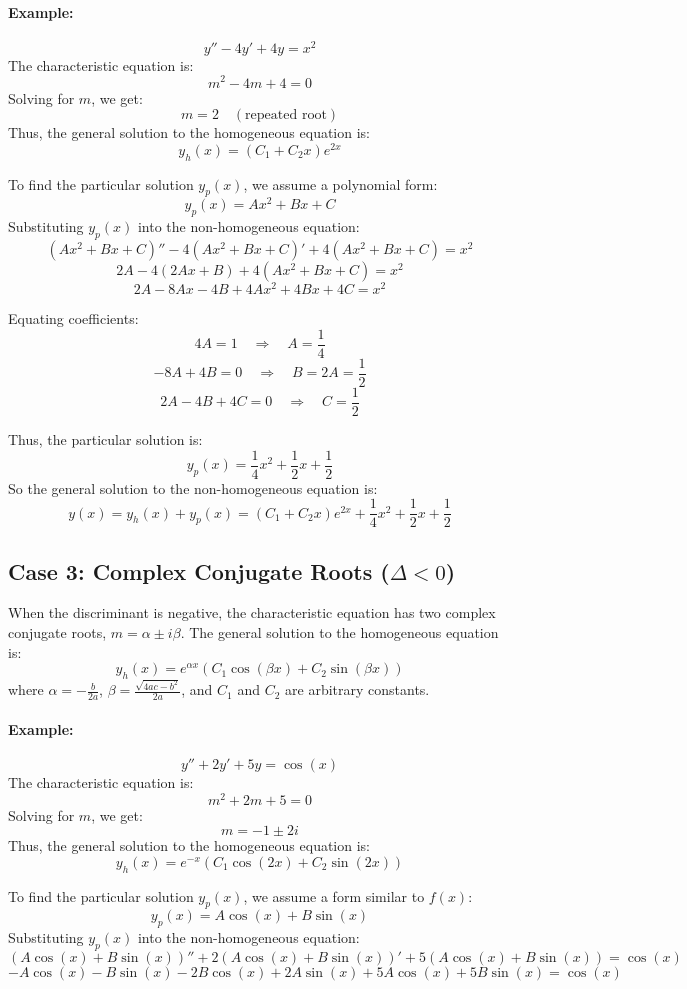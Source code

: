 \documentclass[a4paper,12pt]{article}
\begin{document}
\paragraph{Example:}
\[
y'' - 4y' + 4y = x^2
\]
The characteristic equation is:
\[
m^2 - 4m + 4 = 0
\]
Solving for \(m\), we get:
\[
m = 2 \quad (\text{repeated root})
\]
Thus, the general solution to the homogeneous equation is:
\[
y_h(x) = (C_1 + C_2 x) e^{2x}
\]

To find the particular solution \(y_p(x)\), we assume a polynomial form:
\[
y_p(x) = Ax^2 + Bx + C
\]
Substituting \(y_p(x)\) into the non-homogeneous equation:
\[
(Ax^2 + Bx + C)'' - 4(Ax^2 + Bx + C)' + 4(Ax^2 + Bx + C) = x^2
\]
\[
2A - 4(2Ax + B) + 4(Ax^2 + Bx + C) = x^2
\]
\[
2A - 8Ax - 4B + 4Ax^2 + 4Bx + 4C = x^2
\]

Equating coefficients:
\[
4A = 1 \quad \Rightarrow \quad A = \frac{1}{4}
\]
\[
-8A + 4B = 0 \quad \Rightarrow \quad B = 2A = \frac{1}{2}
\]
\[
2A - 4B + 4C = 0 \quad \Rightarrow \quad C = \frac{1}{2}
\]

Thus, the particular solution is:
\[
y_p(x) = \frac{1}{4}x^2 + \frac{1}{2}x + \frac{1}{2}
\]
So the general solution to the non-homogeneous equation is:
\[
y(x) = y_h(x) + y_p(x) = (C_1 + C_2 x) e^{2x} + \frac{1}{4}x^2 + \frac{1}{2}x + \frac{1}{2}
\]

\subsection*{Case 3: Complex Conjugate Roots (\(\Delta < 0\))}
When the discriminant is negative, the characteristic equation has two complex conjugate roots, \(m = \alpha \pm i\beta\). The general solution to the homogeneous equation is:
\[
y_h(x) = e^{\alpha x} (C_1 \cos(\beta x) + C_2 \sin(\beta x))
\]
where \(\alpha = -\frac{b}{2a}\), \(\beta = \frac{\sqrt{4ac - b^2}}{2a}\), and \(C_1\) and \(C_2\) are arbitrary constants.

\paragraph{Example:}
\[
y'' + 2y' + 5y = \cos(x)
\]
The characteristic equation is:
\[
m^2 + 2m + 5 = 0
\]
Solving for \(m\), we get:
\[
m = -1 \pm 2i
\]
Thus, the general solution to the homogeneous equation is:
\[
y_h(x) = e^{-x} (C_1 \cos(2x) + C_2 \sin(2x))
\]

To find the particular solution \(y_p(x)\), we assume a form similar to \(f(x)\):
\[
y_p(x) = A \cos(x) + B \sin(x)
\]
Substituting \(y_p(x)\) into the non-homogeneous equation:
\[
(A \cos(x) + B \sin(x))'' + 2(A \cos(x) + B \sin(x))' + 5(A \cos(x) + B \sin(x)) = \cos(x)
\]
\[
- A \cos(x) - B \sin(x) - 2B \cos(x) + 2A \sin(x) + 5A \cos(x) + 5B \sin(x) = \cos(x)
\]
\end{document}

